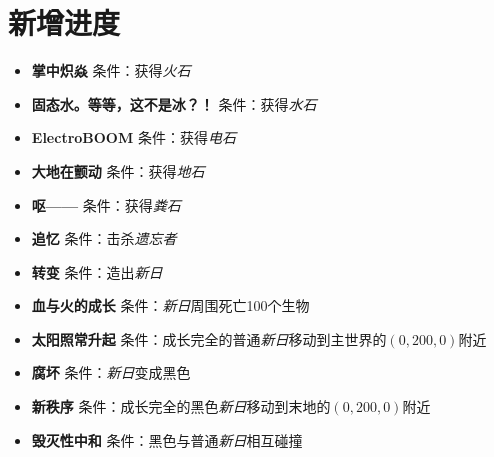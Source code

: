 \documentclass[11pt]{article}
\begin{document}
    \section{新增进度}\label{sec:achievements}
    \begin{itemize}
        \item \textbf{掌中炽焱} \quad 条件：获得\textit{火石}
        \item \textbf{固态水。等等，这不是冰？！} \quad 条件：获得\textit{水石}
        \item \textbf{ElectroBOOM} \quad 条件：获得\textit{电石}
        \item \textbf{大地在颤动} \quad 条件：获得\textit{地石}
        \item \textbf{呕——} \quad 条件：获得\textit{粪石}
        \item \textbf{追忆} \quad 条件：击杀\textit{遗忘者}
        \item \textbf{转变} \quad 条件：造出\textit{新日}
        \item \textbf{血与火的成长} \quad 条件：\textit{新日}周围死亡100个生物
        \item \textbf{太阳照常升起} \quad 条件：成长完全的普通\textit{新日}移动到主世界的$(0, 200, 0)$附近
        \item \textbf{腐坏} \quad 条件：\textit{新日}变成黑色
        \item \textbf{新秩序} \quad 条件：成长完全的黑色\textit{新日}移动到末地的$(0, 200, 0)$附近
        \item \textbf{毁灭性中和} \quad 条件：黑色与普通\textit{新日}相互碰撞
    \end{itemize}
\end{document}
